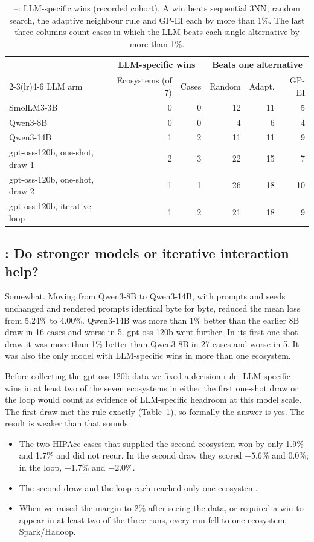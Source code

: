 \begin{table}[t]
\centering
\caption{--: LLM-specific wins (recorded cohort). A win beats sequential 3NN, random search, the adaptive neighbour rule and GP-EI each by more than 1\%. The last three columns count cases in which the LLM beats each single alternative by more than 1\%.}
\label{tab:rq2}
\small
\begin{tabular}{lrrrrr}
\toprule
 & \multicolumn{2}{c}{LLM-specific wins} & \multicolumn{3}{c}{Beats one alternative} \\
\cmidrule(lr){2-3}\cmidrule(lr){4-6}
LLM arm & Ecosystems (of 7) & Cases & Random & Adapt. & GP-EI \\
\midrule
SmolLM3-3B & 0 & 0 & 12 & 11 & 5 \\
Qwen3-8B & 0 & 0 & 4 & 6 & 4 \\
Qwen3-14B & 1 & 2 & 11 & 11 & 9 \\
gpt-oss-120b, one-shot, draw 1 & 2 & 3 & 22 & 15 & 7 \\
gpt-oss-120b, one-shot, draw 2 & 1 & 1 & 26 & 18 & 10 \\
gpt-oss-120b, iterative loop & 1 & 2 & 21 & 18 & 9 \\
\bottomrule
\end{tabular}
\end{table}

\subsection{: Do stronger models or iterative interaction help?}
\label{sec:rq3}

Somewhat. Moving from Qwen3-8B to Qwen3-14B, with prompts and seeds unchanged and rendered prompts identical byte for byte, reduced the mean loss from 5.24\% to 4.00\%. Qwen3-14B was more than 1\% better than the earlier 8B draw in 16 cases and worse in 5. gpt-oss-120b went further. In its first one-shot draw it was more than 1\% better than Qwen3-8B in 27 cases and worse in 5. It was also the only model with LLM-specific wins in more than one ecosystem.

Before collecting the gpt-oss-120b data we fixed a decision rule: LLM-specific wins in at least two of the seven ecosystems in either the first one-shot draw or the loop would count as evidence of LLM-specific headroom at this model scale. The first draw met the rule exactly (Table~\ref{tab:rq2}), so formally the answer is yes. The result is weaker than that sounds:
\begin{itemize}
  \item The two HIPAcc cases that supplied the second ecosystem won by only 1.9\% and 1.7\% and did not recur. In the second draw they scored $-5.6\%$ and 0.0\%; in the loop, $-1.7\%$ and $-2.0\%$.
  \item The second draw and the loop each reached only one ecosystem.
  \item When we raised the margin to 2\% after seeing the data, or required a win to appear in at least two of the three runs, every run fell to one ecosystem, Spark/Hadoop.
\end{itemize}

